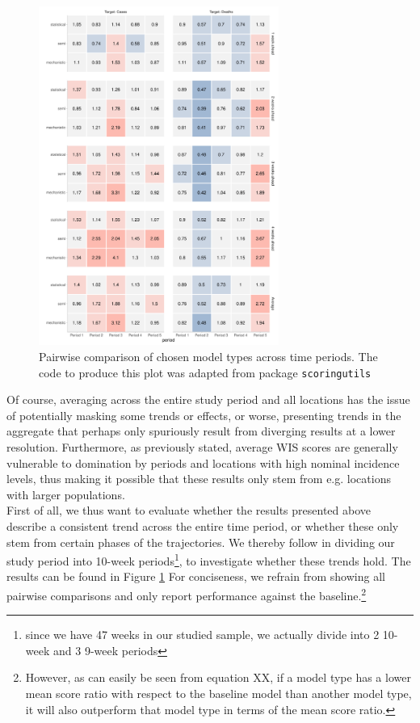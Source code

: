 \begin{figure}
\centering
\includegraphics[width = 0.7\textwidth]{../plots/pw_comp_model_types_across_periods.pdf}
\caption{Pairwise comparison of chosen model types across time periods. The code to produce this plot was adapted from package \texttt{scoringutils}}
\label{fig:pw_comp_modeltypes_byperiod}
\end{figure}
Of course, averaging across the entire study period and all locations has the issue of potentially masking some trends or effects, or worse, presenting trends in the aggregate that perhaps only spuriously result from diverging results at a lower resolution. Furthermore, as previously stated, average WIS scores are generally vulnerable to domination by periods and locations with high nominal incidence levels, thus making it possible that these results only stem from e.g. locations with larger populations.\\ 
First of all, we thus want to evaluate whether the results presented above describe a consistent trend across the entire time period, or whether these only stem from certain phases of the trajectories. We thereby follow \cite{taylor_combining_2021} in dividing our study period into 10-week periods\footnote{since we have 47 weeks in our studied sample, we actually divide into 2 10-week and 3 9-week periods}, to investigate whether these trends hold. The results can be found in Figure \ref{fig:pw_comp_modeltypes_byperiod} For conciseness, we refrain from showing all pairwise comparisons and only report performance against the baseline.\footnote{However, as can easily be seen from equation XX, if a model type has a lower mean score ratio with respect to the baseline model than another model type, it will also outperform that model type in terms of the mean score ratio.}
